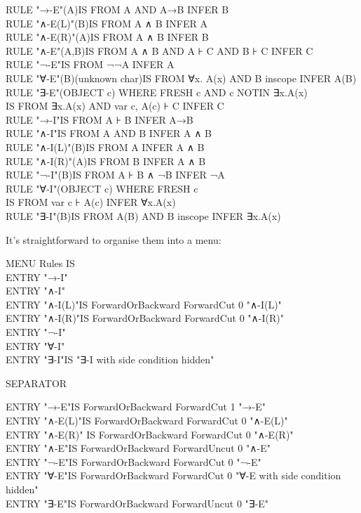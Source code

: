 \documentclass[11pt]{book}
\newcommand{\tab}{\hspace{5mm}}
\begin{document}
RULE "→-E"(A)\tab IS FROM A AND A→B INFER B\\
RULE "∧-E(L)"(B)\tab IS FROM A ∧ B INFER A\\
RULE "∧-E(R)"(A)\tab IS FROM A ∧ B INFER B\\
RULE "∧-E"(A,B)\tab IS FROM A ∧ B AND A ⊦ C AND B ⊦ C INFER C\\
RULE "¬-E"\tab IS FROM ¬¬A INFER A\\
RULE "∀-E"(B)\tab (unknown char)IS FROM ∀x. A(x) AND B inscope INFER A(B)\\
RULE "∃-E"(OBJECT c) WHERE FRESH c AND c NOTIN ∃x.A(x)\\
\tab IS FROM ∃x.A(x) AND var c, A(c) ⊦ C INFER C\\
RULE "→-I"\tab IS FROM A ⊦ B INFER A→B\\
RULE "∧-I"\tab IS FROM A AND B INFER A ∧ B\\
RULE "∧-I(L)"(B)\tab IS FROM A INFER A ∧ B\\
RULE "∧-I(R)"(A)\tab IS FROM B INFER A ∧ B\\
RULE "¬-I"(B)\tab IS FROM A ⊦ B ∧ ¬B INFER ¬A\\
RULE "∀-I"(OBJECT c) WHERE FRESH c\\
\tab IS FROM var c ⊦ A(c) INFER ∀x.A(x)\\
RULE "∃-I"(B)\tab IS FROM A(B) AND B inscope INFER ∃x.A(x)


It's straightforward to organise them into a menu:

MENU Rules IS\\
\tab ENTRY "→-I"\\
\tab ENTRY "∧-I"\tab \\
\tab ENTRY "∧-I(L)"\tab IS ForwardOrBackward ForwardCut 0 "∧-I(L)"\\
\tab ENTRY "∧-I(R)"\tab IS ForwardOrBackward ForwardCut 0 "∧-I(R)"\\
\tab ENTRY "¬-I"\\
\tab ENTRY "∀-I"\\
\tab ENTRY "∃-I"\tab IS "∃-I with side condition hidden"

\tab SEPARATOR

\tab ENTRY "→-E"\tab IS ForwardOrBackward ForwardCut 1 "→-E" \\
\tab ENTRY "∧-E(L)"\tab IS ForwardOrBackward ForwardCut 0 "∧-E(L)"\\
\tab ENTRY "∧-E(R)" \tab IS ForwardOrBackward ForwardCut 0 "∧-E(R)"\\
\tab ENTRY "∧-E"\tab IS ForwardOrBackward ForwardUncut 0 "∧-E"\tab \\
\tab ENTRY "¬-E"\tab IS ForwardOrBackward ForwardCut 0 "¬-E"\tab \\
\tab ENTRY "∀-E"\tab IS ForwardOrBackward ForwardCut 0 "∀-E with side condition hidden"\\
\tab ENTRY "∃-E"\tab IS ForwardOrBackward ForwardUncut 0 "∃-E"
\end{document}
